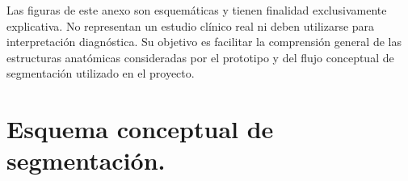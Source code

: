 Las figuras de este anexo son esquemáticas y tienen finalidad exclusivamente explicativa. No representan un estudio clínico real ni deben utilizarse para interpretación diagnóstica. Su objetivo es facilitar la comprensión general de las estructuras anatómicas consideradas por el prototipo y del flujo conceptual de segmentación utilizado en el proyecto.


\section{Esquema conceptual de segmentación.}

